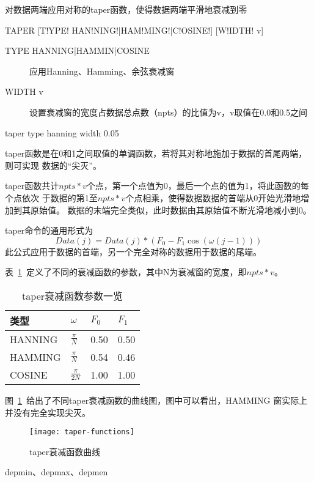 \label{cmd:taper}

对数据两端应用对称的taper函数，使得数据两端平滑地衰减到零

\begin{SACSTX}
TAPER [T!YPE! HAN!NING!|HAM!MING!|C!OSINE!] [W!IDTH! v]
\end{SACSTX}

\begin{description}
\item [TYPE HANNING|HAMMIN|COSINE] 应用Hanning、Hamming、余弦衰减窗
\item [WIDTH v] 设置衰减窗的宽度占数据总点数（npts）的比值为v，v取值在0.0和0.5之间
\end{description}

\begin{SACDFT}
taper type hanning width 0.05
\end{SACDFT}

taper函数是在0和1之间取值的单调函数，若将其对称地施加于数据的首尾两端，则可实现
数据的``尖灭''。

taper函数共计$npts*v$个点，第一个点值为0，最后一个点的值为1，将此函数的每个点依次
于数据的第1至$npts*v$个点相乘，使得数据数据的首端从0开始光滑地增加到其原始值。
数据的末端完全类似，此时数据由其原始值不断光滑地减小到0。

taper命令的通用形式为
\[
    Data(j) = Data(j)*(F_0 - F_1\cos(\omega(j-1)))
\]
此公式应用于数据的首端，另一个完全对称的数据用于数据的尾端。

表~\ref{table:taper-functions}~定义了不同的衰减函数的参数，其中N为衰减窗的宽度，即$npts*v$。
\begin{table}[ht]
\centering
\caption{taper衰减函数参数一览}
\label{table:taper-functions}
\begin{tabular}{llll}
\toprule
类型 & $\omega$ & $F_0$	& $F_1$	\\
\midrule
HANNING	&	$\frac{\pi}{N}$	&	0.50	&	0.50	\\
HAMMING	&	$\frac{\pi}{N}$	&	0.54	&	0.46	\\
COSINE	&	$\frac{\pi}{2N}$	&	1.00	&	1.00	\\
\bottomrule
\end{tabular}
\end{table}

图~\ref{fig:taper-functions}~给出了不同taper衰减函数的曲线图，图中可以看出，HAMMING
窗实际上并没有完全实现尖灭。
\begin{figure}[!ht]
\centering
\texttt{[image: taper-functions]}
\caption{taper衰减函数曲线}
\label{fig:taper-functions}
\end{figure}

depmin、depmax、depmen
